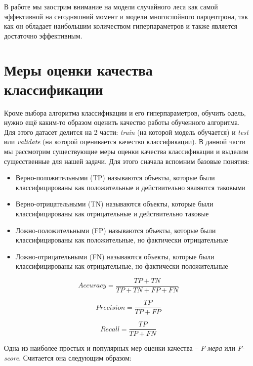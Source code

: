 \documentclass[times,specification,annotation]{itmo-student-thesis}
\begin{document}
	В работе мы заострим внимание на модели случайного леса как самой эффективной на сегодняшний момент и модели многослойного парцептрона, так как он обладает наибольшим количеством гиперпараметров и также является достаточно эффективным.
	
	\section{Меры оценки качества классификации} \label{s:mcl}
	Кроме выбора алгоритма классификации и его гиперпараметров, обучить одель, нужно ещё каким-то образом оценить качество работы обученного алгоритма. Для этого датасет делится на 2 части: \textit{train} (на которой модель обучается) и \textit{test} или \textit{validate} (на которой оценивается качество классификации). В данной части мы рассмотрим существующие меры оценки качества классификации и выделим сущесственные для нашей задачи. Для этого сначала вспомним базовые понятия:
	\begin{itemize}
		\item Верно-положительными (TP) называются объекты, которые были классифицированы как положительные и действительно являются таковыми
		\item Верно-отрицательными (TN) называются объекты, которые были классифицированы как отрицательные и действительно таковые 
		\item Ложно-положительными (FP) называются объекты, которые были классифицированы как положительные, но фактически отрицательные
		\item Ложно-отрицательными (FN) называются объекты, которые были классифицированы как отрицательные, но фактически положительные
	\end{itemize}

	\begin{equation}
	Accuracy = \frac{TP+TN}{TP+TN+FP+FN} 
	\label{eq:accuracy}
	\end{equation}
	
	\begin{equation} 
	Precision = \frac{TP}{TP+FP} 
	\label{eq:precision}
	\end{equation}
	
	\begin{equation}
	Recall =  \frac{TP}{TP+FN}
	\label{eq:recall}
	\end{equation}
	
	Одна из наиболее простых и популярных мер оценки качества -- \textit{F-мера} или \textit{F-score}. Считается она следующим образом:
	
\end{document}
